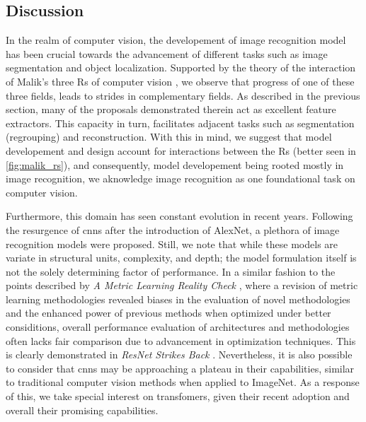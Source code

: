 \subsection{Discussion}
\label{subsec:rel_recon_discussion}
In the realm of computer vision, the developement of image recognition model has been crucial 
towards the advancement of different tasks such as image segmentation and object localization. 
Supported by the theory of the interaction of Malik's three Rs of computer vision 
\autocite{malik2016three}, we observe that progress of one of these three fields, leads to strides 
in complementary fields. As described in the previous section, many of the proposals demonstrated 
therein act as excellent feature extractors. This capacity in turn, facilitates adjacent tasks 
such as segmentation (regrouping) and reconstruction. With this in mind, we suggest that model 
developement and design account for interactions between the Rs (better seen in  
\autoref{fig:malik_rs}), and consequently, model developement being rooted mostly in image 
recognition, we aknowledge image recognition as one foundational task on computer vision.



\noindent Furthermore, this domain has seen constant evolution in recent years. Following the 
resurgence of \glspl{cnn} after the introduction of AlexNet, a plethora of image recognition models 
were proposed. Still, we note that while these models are variate in structural units, complexity, 
and depth; the model formulation  itself is not the solely determining factor of performance.  
In a similar fashion to the points described by \emph{A Metric Learning Reality 
Check} \autocite{musgrave2020metric}, where a revision of metric learning methodologies revealed 
biases in the evaluation of novel methodologies and the enhanced power of 
previous methods when optimized under better considitions, overall performance evaluation of 
architectures and methodologies often lacks fair comparison due to advancement in optimization 
techniques. This is clearly demonstrated in \emph{ResNet Strikes Back} \autocite{wightman2021resnet}. 
Nevertheless, it is also possible to consider that \glspl{cnn} may be approaching a plateau in 
their capabilities, similar to traditional computer vision methods  when applied to ImageNet. As 
a response of this, we take special interest on transfomers, given their recent adoption and 
overall their promising capabilities. \\

